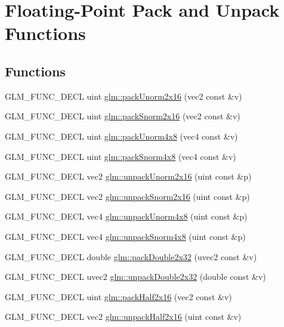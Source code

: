 \hypertarget{group__core__func__packing}{\section{Floating-\/\-Point Pack and Unpack Functions}
\label{group__core__func__packing}
}
\subsection*{Functions}
\begin{DoxyCompactItemize}
\item 
G\-L\-M\-\_\-\-F\-U\-N\-C\-\_\-\-D\-E\-C\-L uint \hyperlink{group__core__func__packing_ga0659ddaf09727551c7bf51655d2a65cf}{glm\-::pack\-Unorm2x16} (vec2 const \&v)
\item 
G\-L\-M\-\_\-\-F\-U\-N\-C\-\_\-\-D\-E\-C\-L uint \hyperlink{group__core__func__packing_ga0c8005de240d6c4ca3d16c7bee25c622}{glm\-::pack\-Snorm2x16} (vec2 const \&v)
\item 
G\-L\-M\-\_\-\-F\-U\-N\-C\-\_\-\-D\-E\-C\-L uint \hyperlink{group__core__func__packing_ga834ee9a9e73dcb0a7c1fc88143f3edb8}{glm\-::pack\-Unorm4x8} (vec4 const \&v)
\item 
G\-L\-M\-\_\-\-F\-U\-N\-C\-\_\-\-D\-E\-C\-L uint \hyperlink{group__core__func__packing_gafcf25acc0d361c6c696a433aa5dfd16b}{glm\-::pack\-Snorm4x8} (vec4 const \&v)
\item 
G\-L\-M\-\_\-\-F\-U\-N\-C\-\_\-\-D\-E\-C\-L vec2 \hyperlink{group__core__func__packing_gaff327a2fca8abfe31b74b914b68ac5ec}{glm\-::unpack\-Unorm2x16} (uint const \&p)
\item 
G\-L\-M\-\_\-\-F\-U\-N\-C\-\_\-\-D\-E\-C\-L vec2 \hyperlink{group__core__func__packing_gaa3f9bd6a71d7bdfab090b9626f2466aa}{glm\-::unpack\-Snorm2x16} (uint const \&p)
\item 
G\-L\-M\-\_\-\-F\-U\-N\-C\-\_\-\-D\-E\-C\-L vec4 \hyperlink{group__core__func__packing_ga5d3c4d354b48a317935349dd62a8b8a5}{glm\-::unpack\-Unorm4x8} (uint const \&p)
\item 
G\-L\-M\-\_\-\-F\-U\-N\-C\-\_\-\-D\-E\-C\-L vec4 \hyperlink{group__core__func__packing_ga126a0deffef1f2d10dd67237981a870b}{glm\-::unpack\-Snorm4x8} (uint const \&p)
\item 
G\-L\-M\-\_\-\-F\-U\-N\-C\-\_\-\-D\-E\-C\-L double \hyperlink{group__core__func__packing_gaf728fdfb98ce34da6f968d9f6bf154d7}{glm\-::pack\-Double2x32} (uvec2 const \&v)
\item 
G\-L\-M\-\_\-\-F\-U\-N\-C\-\_\-\-D\-E\-C\-L uvec2 \hyperlink{group__core__func__packing_ga7e8cf88c278c18969c99af83bceed024}{glm\-::unpack\-Double2x32} (double const \&v)
\item 
G\-L\-M\-\_\-\-F\-U\-N\-C\-\_\-\-D\-E\-C\-L uint \hyperlink{group__core__func__packing_ga082f6dd65f73a547ed3067ef00be036f}{glm\-::pack\-Half2x16} (vec2 const \&v)
\item 
G\-L\-M\-\_\-\-F\-U\-N\-C\-\_\-\-D\-E\-C\-L vec2 \hyperlink{group__core__func__packing_ga4051804cc2c930ba4ca73382b79edf1d}{glm\-::unpack\-Half2x16} (uint const \&v)
\end{DoxyCompactItemize}


